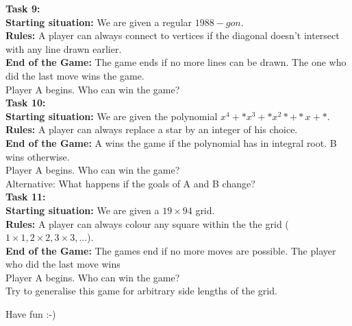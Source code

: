 \documentclass[11pt,a5paper]{article}
\begin{document}
\noindent
\textbf{Task 9:}\\
\noindent
\textbf{Starting situation:} We are given a regular $1988-gon$.\\
\textbf{Rules:} A player can always connect to vertices if the diagonal doesn't intersect with any line drawn earlier.\\
\textbf{End of the Game:} The game ends if no more lines can be drawn. The one who did the last move wins the game.\\
\noindent
Player A begins. Who can win the game?\\

\noindent
\textbf{Task 10:}\\
\noindent
\textbf{Starting situation:} We are given the polynomial $x^4+*x^3+*x^2*+*x+*$.\\
\textbf{Rules:} A player can always replace a star by an integer of his choice.\\
\textbf{End of the Game:} A wins the game if the polynomial has in integral root. B wins otherwise.\\
\noindent
Player A begins. Who can win the game?\\
Alternative: What happens if the goals of A and B change?\\

\noindent
\textbf{Task 11:}\\
\noindent
\textbf{Starting situation:} We are given a $19 \times 94$ grid.\\
\textbf{Rules:} A player can always colour any square within the the grid ($1\times1, 2\times2, 3\times3,...$).\\
\textbf{End of the Game:} The games end if no more moves are possible. The player who did the last move wins\\
\noindent
Player A begins. Who can win the game?\\
Try to generalise this game for arbitrary side lengths of the grid. \\[1cm]

\begin{center}
Have fun :-)
\end{center}
\end{document}
